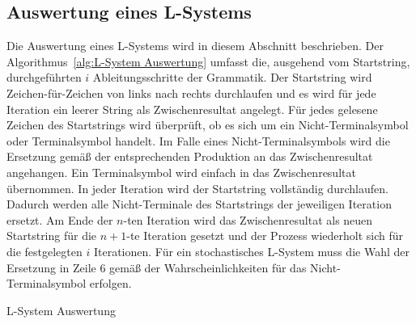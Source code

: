 \subsection{Auswertung eines L-Systems}
Die Auswertung eines L-Systems wird in diesem Abschnitt beschrieben.
Der Algorithmus~\ref{alg:L-System Auswertung} umfasst die, ausgehend vom Startstring, durchgeführten $i$ Ableitungsschritte der Grammatik.
Der Startstring wird Zeichen-für-Zeichen von links nach rechts durchlaufen und es wird für jede Iteration ein leerer String als Zwischenresultat angelegt.
Für jedes gelesene Zeichen des Startstrings wird überprüft, ob es sich um ein Nicht-Terminalsymbol oder Terminalsymbol handelt.
Im Falle eines Nicht-Terminalsymbols wird die Ersetzung gemäß der entsprechenden Produktion an das Zwischenresultat angehangen.
Ein Terminalsymbol wird einfach in das Zwischenresultat übernommen.
In jeder Iteration wird der Startstring vollständig durchlaufen.
Dadurch werden alle Nicht-Terminale des Startstrings der jeweiligen Iteration ersetzt.
Am Ende der $n$-ten Iteration wird das Zwischenresultat als neuen Startstring für die $n+1$-te Iteration gesetzt und der Prozess wiederholt sich für die festgelegten $i$ Iterationen.
Für ein stochastisches L-System muss die Wahl der Ersetzung in Zeile 6 gemäß der Wahrscheinlichkeiten für das Nicht-Terminalsymbol erfolgen.

\begin{algorithm}[H]
    \begin{algorithmic}[1]
        \footnotesize
        \ELSE
        \ENDIF
        \ENDFOR
        \ENDFOR
    \end{algorithmic}
    \caption{L-System Auswertung}\label{alg:L-System Auswertung}
\end{algorithm}
